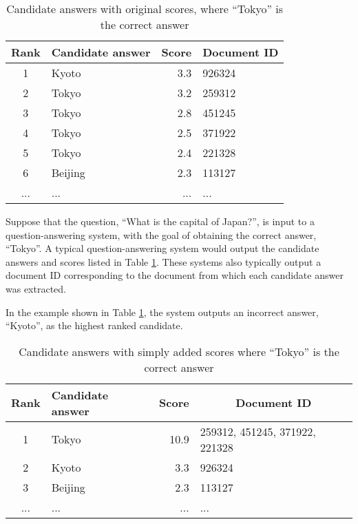 \begin{table}[t]
  \begin{center}
    \caption{Candidate answers with original scores, where ``Tokyo'' is the correct answer}
    \begin{tabular}{|c|l|r|l|} \hline
Rank & Candidate answer & Score & \multicolumn{1}{c|}{Document ID}\\\hline
1 & Kyoto & 3.3 & 926324\\
2 & Tokyo & 3.2 & 259312\\
3 & Tokyo & 2.8 & 451245\\
4 & Tokyo & 2.5 & 371922\\
5 & Tokyo & 2.4 & 221328\\
6 & Beijing & 2.3 &113127\\
... & ... & ...& ...\\\hline
\end{tabular}
\label{tab:plural_candidates}
\end{center}
\end{table}

Suppose that the question, ``What is the capital of Japan?'', 
is input to a question-answering system, with the goal of 
obtaining the correct answer, ``Tokyo''.
A typical question-answering system would output 
the candidate answers and scores listed in Table \ref{tab:plural_candidates}.
These systems also typically output a document ID 
corresponding to the document from which each candidate answer was extracted.

In the example shown in 
Table \ref{tab:plural_candidates}, 
the system outputs an incorrect answer, ``Kyoto'', as the highest ranked candidate. 

\begin{table}[t]
  \begin{center}
    \caption{Candidate answers with simply added scores where ``Tokyo'' is the correct answer}
    \begin{tabular}{|c|l|r|l|} \hline
Rank & Candidate answer & Score & \multicolumn{1}{c|}{Document ID}\\\hline
1 & Tokyo & 10.9 & 259312, 451245, 371922, 221328\\
2 & Kyoto & 3.3 & 926324\\
3 & Beijing & 2.3 &113127\\
... & ... & ...& ...\\\hline
\end{tabular}
\label{tab:plural_candidates2}
\end{center}
\end{table}

